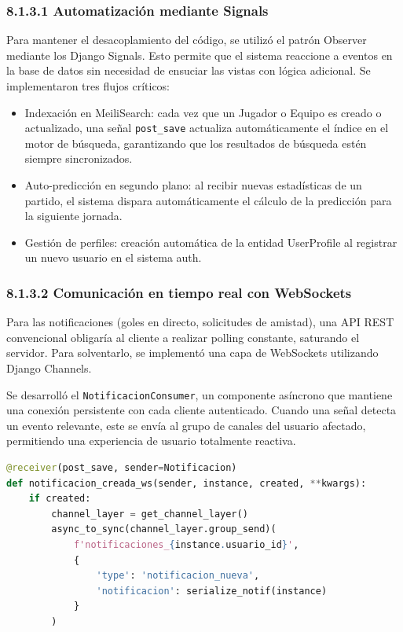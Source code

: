 \subsubsection{8.1.3.1 Automatización mediante Signals}

Para mantener el desacoplamiento del código, se utilizó el patrón Observer mediante los Django Signals. Esto permite que el sistema reaccione a 
eventos en la base de datos sin necesidad de ensuciar las vistas con lógica adicional. Se implementaron tres flujos críticos:

\begin{itemize}
\item Indexación en MeiliSearch: cada vez que un Jugador o Equipo es creado o actualizado, una señal \texttt{post\_save} actualiza automáticamente el índice en el motor de búsqueda, garantizando que los resultados de búsqueda estén siempre sincronizados.
\item Auto-predicción en segundo plano: al recibir nuevas estadísticas de un partido, el sistema dispara automáticamente el cálculo de la predicción para la siguiente jornada.
\item Gestión de perfiles: creación automática de la entidad UserProfile al registrar un nuevo usuario en el sistema auth.
\end{itemize}

\subsubsection{8.1.3.2 Comunicación en tiempo real con WebSockets}

Para las notificaciones (goles en directo, solicitudes de amistad), una API REST convencional obligaría al cliente a realizar polling constante,
 saturando el servidor. Para solventarlo, se implementó una capa de WebSockets utilizando Django Channels.

Se desarrolló el \texttt{NotificacionConsumer}, un componente asíncrono que 
mantiene una conexión persistente con cada cliente autenticado. Cuando una 
señal detecta un evento relevante, este se envía al grupo de canales del 
usuario afectado, permitiendo una experiencia de usuario totalmente reactiva.

\begin{lstlisting}[language=Python,caption={Signal de Django para 
emitir notificaciones en tiempo real vía WebSockets}]
@receiver(post_save, sender=Notificacion)
def notificacion_creada_ws(sender, instance, created, **kwargs):
    if created:
        channel_layer = get_channel_layer()
        async_to_sync(channel_layer.group_send)(
            f'notificaciones_{instance.usuario_id}',
            {
                'type': 'notificacion_nueva',
                'notificacion': serialize_notif(instance)
            }
        )
\end{lstlisting}

